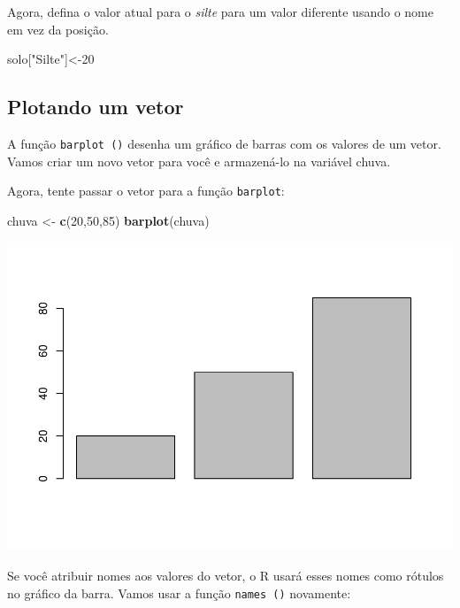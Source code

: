 \documentclass[
]{book}
\newenvironment{Shaded}{\begin{snugshade}}{\end{snugshade}}
\newcommand{\DecValTok}[1]{\textcolor[rgb]{0.00,0.00,0.81}{#1}}
\newcommand{\KeywordTok}[1]{\textcolor[rgb]{0.13,0.29,0.53}{\textbf{#1}}}
\newcommand{\NormalTok}[1]{#1}
\newcommand{\StringTok}[1]{\textcolor[rgb]{0.31,0.60,0.02}{#1}}
\begin{document}
Agora, defina o valor atual para o \emph{silte} para um valor diferente usando o nome em vez da posição.

\begin{Shaded}
\begin{Highlighting}[]
\NormalTok{solo[}\StringTok{"Silte"}\NormalTok{]<-}\DecValTok{20}
\end{Highlighting}
\end{Shaded}

\hypertarget{plotando-um-vetor}{%
\subsection{Plotando um vetor}\label{plotando-um-vetor}}

A função \texttt{barplot\ ()} desenha um gráfico de barras com os valores de um vetor. Vamos criar um novo vetor para você e armazená-lo na variável chuva.

Agora, tente passar o vetor para a função \texttt{barplot}:

\begin{Shaded}
\begin{Highlighting}[]
\NormalTok{chuva <-}\StringTok{ }\KeywordTok{c}\NormalTok{(}\DecValTok{20}\NormalTok{,}\DecValTok{50}\NormalTok{,}\DecValTok{85}\NormalTok{)}
\KeywordTok{barplot}\NormalTok{(chuva)}
\end{Highlighting}
\end{Shaded}

\includegraphics{TudodoR_files/figure-latex/unnamed-chunk-32-1.pdf}

Se você atribuir nomes aos valores do vetor, o R usará esses nomes como rótulos no gráfico da barra. Vamos usar a função \texttt{names\ ()} novamente:
\end{document}

